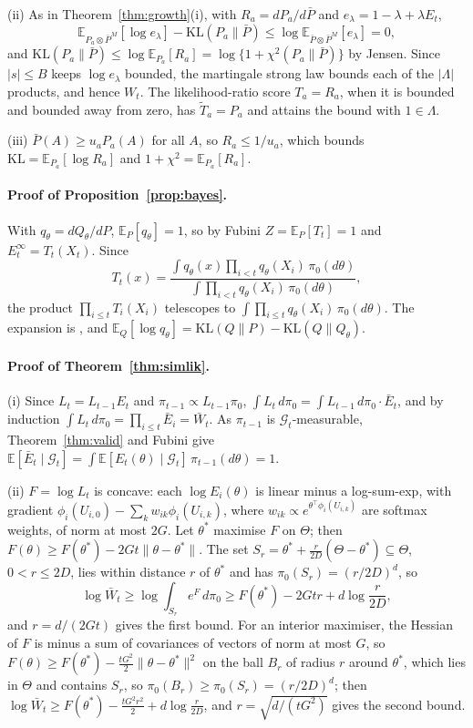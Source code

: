 \documentclass[pdflatex,sn-mathphys-ay]{sn-jnl}
\newcommand{\E}{\mathbb{E}}
\newcommand{\KL}{\mathrm{KL}}
\newcommand{\G}{\mathcal{G}}
\theoremstyle{thmstyleone}
\theoremstyle{thmstyletwo}
\begin{document}
\begin{appendices}
(ii) As in Theorem~\ref{thm:growth}(i), with $R_a = dP_a/d\bar P$ and
$e_\lambda = 1 - \lambda + \lambda E_t$,
\[
\E_{P_a \otimes \bar P^M}[\log e_\lambda] - \KL(P_a\|\bar P)
\le \log \E_{\bar P \otimes \bar P^M}[e_\lambda] = 0,
\]
and $\KL(P_a\|\bar P) \le \log\E_{P_a}[R_a] = \log\{1 + \chi^2(P_a\|\bar P)\}$ by
Jensen. Since $|s| \le B$ keeps $\log e_\lambda$ bounded, the martingale strong
law bounds each of the $|\Lambda|$ products, and hence $W_t$. The
likelihood-ratio score $T_a = R_a$, when it is bounded and bounded away from
zero, has $\tilde T_a = P_a$ and attains the bound with $1 \in \Lambda$.

(iii) $\bar P(A) \ge u_a P_a(A)$ for all $A$, so $R_a \le 1/u_a$, which bounds
$\KL = \E_{P_a}[\log R_a]$ and $1 + \chi^2 = \E_{P_a}[R_a]$.

\paragraph{Proof of Proposition~\ref{prop:bayes}.}
With $q_\theta = dQ_\theta/dP$, $\E_P[q_\theta] = 1$, so by Fubini
$Z = \E_P[T_t] = 1$ and $E_t^\infty = T_t(X_t)$. Since
\[
T_t(x) = \frac{\int q_\theta(x) \prod_{i<t} q_\theta(X_i)\,\pi_0(d\theta)}
{\int \prod_{i<t} q_\theta(X_i)\,\pi_0(d\theta)},
\]
the product $\prod_{i \le t} T_i(X_i)$ telescopes to
$\int \prod_{i \le t} q_\theta(X_i)\,\pi_0(d\theta)$. The expansion is
\citet{clarke1990information}, and $\E_Q[\log q_\theta] = \KL(Q\|P) - \KL(Q\|Q_\theta)$.

\paragraph{Proof of Theorem~\ref{thm:simlik}.}
(i) Since $L_t = L_{t-1}E_t$ and $\pi_{t-1} \propto L_{t-1}\pi_0$,
$\int L_t\, d\pi_0 = \int L_{t-1}\,d\pi_0 \cdot \bar E_t$, and by induction
$\int L_t\,d\pi_0 = \prod_{i \le t}\bar E_i = \bar W_t$. As $\pi_{t-1}$ is
$\G_t$-measurable, Theorem~\ref{thm:valid} and Fubini give
$\E[\bar E_t \mid \G_t] = \int \E[E_t(\theta) \mid \G_t]\,\pi_{t-1}(d\theta) = 1$.

(ii) $F = \log L_t$ is concave: each $\log E_i(\theta)$ is linear minus a
log-sum-exp, with gradient $\phi_i(U_{i,0}) - \sum_k w_{ik}\phi_i(U_{i,k})$, where
$w_{ik} \propto e^{\theta^\top\phi_i(U_{i,k})}$ are softmax weights, of norm at
most $2G$. Let $\theta^*$ maximise $F$ on $\Theta$; then
$F(\theta) \ge F(\theta^*) - 2Gt\|\theta - \theta^*\|$. The set
$S_r = \theta^* + \frac{r}{2D}(\Theta - \theta^*) \subseteq \Theta$, $0 < r \le 2D$,
lies within distance $r$ of $\theta^*$ and has $\pi_0(S_r) = (r/2D)^d$, so
\[
\log \bar W_t \ge \log\int_{S_r} e^{F}\, d\pi_0 \ge F(\theta^*) - 2Gtr + d \log\frac{r}{2D},
\]
and $r = d/(2Gt)$ gives the first bound. For an interior maximiser, the
Hessian of $F$ is minus a sum of covariances of vectors of norm at most $G$, so
$F(\theta) \ge F(\theta^*) - \frac{tG^2}{2}\|\theta-\theta^*\|^2$ on the ball $B_r$
of radius $r$ around $\theta^*$, which lies in $\Theta$ and contains $S_r$, so
$\pi_0(B_r) \ge \pi_0(S_r) = (r/2D)^d$; then
$\log \bar W_t \ge F(\theta^*) - \frac{tG^2 r^2}{2} + d\log\frac{r}{2D}$, and
$r = \sqrt{d/(tG^2)}$ gives the second bound.


\end{appendices}
\end{document}
